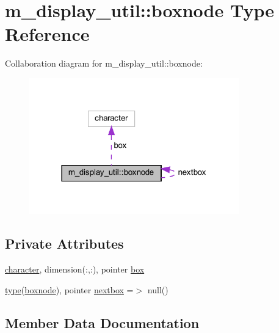 \hypertarget{structm__display__util_1_1boxnode}{}\section{m\+\_\+display\+\_\+util\+:\+:boxnode Type Reference}
\label{structm__display__util_1_1boxnode}


Collaboration diagram for m\+\_\+display\+\_\+util\+:\+:boxnode\+:
\nopagebreak
\begin{figure}[H]
\begin{center}
\leavevmode
\includegraphics[width=258pt]{structm__display__util_1_1boxnode__coll__graph}
\end{center}
\end{figure}
\subsection*{Private Attributes}
\begin{DoxyCompactItemize}
\item 
\hyperlink{option__stopwatch_83_8txt_abd4b21fbbd175834027b5224bfe97e66}{character}, dimension(\+:,\+:), pointer \hyperlink{structm__display__util_1_1boxnode_a370dd4c2505b16a7e740eb84823b943a}{box}
\item 
\hyperlink{stop__watch_83_8txt_a70f0ead91c32e25323c03265aa302c1c}{type}(\hyperlink{structm__display__util_1_1boxnode}{boxnode}), pointer \hyperlink{structm__display__util_1_1boxnode_a66de6cb2ce074d35d978a4ac8f3bd29e}{nextbox} =$>$ null()
\end{DoxyCompactItemize}


\subsection{Member Data Documentation}
\mbox{\label{structm__display__util_1_1boxnode_a370dd4c2505b16a7e740eb84823b943a}} 
